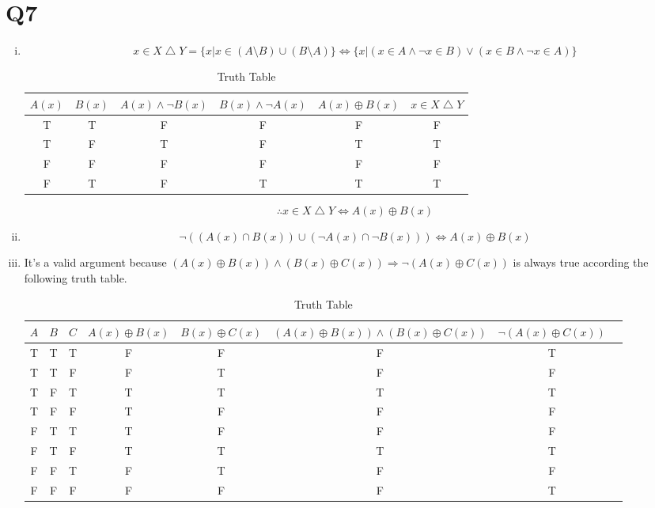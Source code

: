\documentclass[12pt]{article}
\begin{document}
\section{Q7}
\begin{enumerate}[(i)]
\item
$$x\in X\bigtriangleup Y=\{x|x\in (A\setminus B)\cup (B\setminus A)\}\Leftrightarrow\{x|(x\in A \wedge\neg x\in B)\vee(x\in B \wedge\neg x\in A)\}$$
\begin{table}[H]
\centering
\begin{tabular}{|c|c|c|c|c|c|}
\hline
$A(x)$ & $B(x)$ &$A(x)\wedge\neg B(x)$  &$B(x)\wedge\neg A(x)$ &$A(x)\oplus B(x)$ &$x\in X\bigtriangleup Y$ \\ \hline
T & T &F  &F  &F  &F\\ \hline
T & F &T  &F  &T  &T \\ \hline
F & F &F  &F  &F  &F\\ \hline
F & T &F  &T  &T  &T\\ \hline
\end{tabular}
\caption{Truth Table}
\end{table}
$$\therefore x\in X\bigtriangleup Y\Leftrightarrow A(x)\oplus B(x) $$
\item
$$\neg((A(x)\cap B(x))\cup(\neg A(x)\cap\neg B(x)))\Leftrightarrow A(x)\oplus B(x)$$
\item 
It's a valid argument because $(A(x)\oplus B(x))\wedge(B(x)\oplus C(x))\Rightarrow \neg(A(x)\oplus C(x))$ is always true according the following truth table.
\begin{table}[H]
\centering
\begin{tabular}{|c|c|c|c|c|c|c|c|}
\hline
$A$ & $B$ &$C$  &$A(x)\oplus B(x)$&$B(x)\oplus C(x)$&$(A(x)\oplus B(x))\wedge(B(x)\oplus C(x))$&$\neg(A(x)\oplus C(x))$ \\ \hline
T & T &T  &F  &F&F  &T\\ \hline
T & T &F  &F  &T&F  &F \\ \hline
T & F &T  &T  &T&T  &T\\ \hline
T & F &F  &T  &F&F  &F\\ \hline
F & T &T  &T  &F&F  &F\\ \hline
F & T &F  &T  &T&T  &T \\ \hline
F & F &T  &F  &T&F  &F\\ \hline
F & F &F  &F  &F&F  &T\\ \hline
\end{tabular}
\caption{Truth Table}
\end{table}
\end{enumerate}
\end{document}
